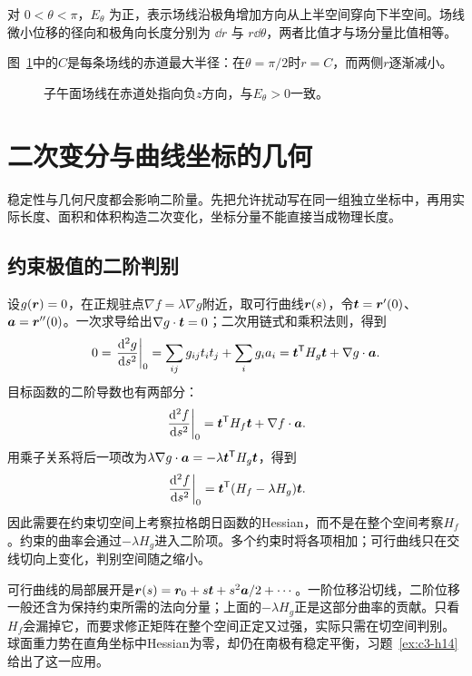 \begin{solution}
对 $0<\theta<\pi$，$E_\theta$ 为正，表示场线沿极角增加方向从上半空间穿向下半空间。场线微小位移的径向和极角向长度分别为 $\dd r$ 与 $r\dd\theta$，两者比值才与场分量比值相等。

图~\ref{fig:c3-e10-s}中的$C$是每条场线的赤道最大半径：在$\theta=\pi/2$时$r=C$，而两侧$r$逐渐减小。

\begin{figure}[H]\centering
{}
\caption{子午面场线在赤道处指向负$z$方向，与$E_\theta>0$一致。}\label{fig:c3-e10-s}
\end{figure}
\end{solution}

\section{二次变分与曲线坐标的几何}
稳定性与几何尺度都会影响二阶量。先把允许扰动写在同一组独立坐标中，再用实际长度、面积和体积构造二次变化，坐标分量不能直接当成物理长度。

\subsection{约束极值的二阶判别}
设$g(\bm{r})=0$，在正规驻点$\nabla f=\lambda\nabla g$附近，取可行曲线$\bm{r}(s)$，令$\bm{t}=\bm{r}'(0)$、$\bm{a}=\bm{r}''(0)$。一次求导给出$\nabla g\cdot\bm{t}=0$；二次用链式和乘积法则，得到
\[0=\left.\frac{\mathop{}\!\mathrm d^2g}{\mathop{}\!\mathrm d s^2}\right|_0
=\sum_{ij}g_{ij}t_it_j+\sum_i g_i a_i
=\bm{t}^{\mathsf T}H_g\bm{t}+\nabla g\cdot\bm{a}.\]
目标函数的二阶导数也有两部分：
\[\left.\frac{\mathop{}\!\mathrm d^2f}{\mathop{}\!\mathrm d s^2}\right|_0
=\bm{t}^{\mathsf T}H_f\bm{t}+\nabla f\cdot\bm{a}.\]
用乘子关系将后一项改为$\lambda\nabla g\cdot\bm{a}=-\lambda\bm{t}^{\mathsf T}H_g\bm{t}$，得到
\[\left.\frac{\mathop{}\!\mathrm d^2 f}{\mathop{}\!\mathrm d s^2}\right|_0
=\bm{t}^{\mathsf T}(H_f-\lambda H_g)\bm{t}.
\]
因此需要在约束切空间上考察拉格朗日函数的Hessian，而不是在整个空间考察$H_f$。约束的曲率会通过$-\lambda H_g$进入二阶项。多个约束时将各项相加；可行曲线只在交线切向上变化，判别空间随之缩小。

可行曲线的局部展开是$\bm{r}(s)=\bm{r}_0+s\bm{t}+s^2\bm{a}/2+\cdots$。一阶位移沿切线，二阶位移一般还含为保持约束所需的法向分量；上面的$-\lambda H_g$正是这部分曲率的贡献。只看$H_f$会漏掉它，而要求修正矩阵在整个空间正定又过强，实际只需在切空间判别。球面重力势在直角坐标中Hessian为零，却仍在南极有稳定平衡，习题~\ref{ex:c3-h14}给出了这一应用。

